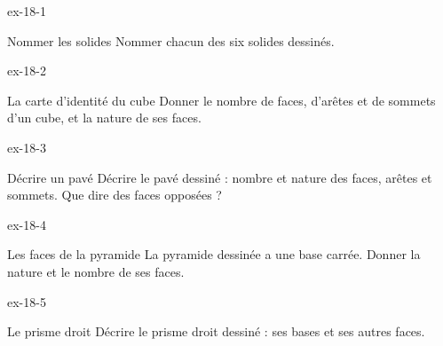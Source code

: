 \clearpage{}
\begin{blocLivre}{ex-18-1}\begin{exercice}[1]{Nommer les solides}
Nommer chacun des six solides dessinés.
\label{fig-ex-18-1}
\end{exercice}\end{blocLivre}
\begin{blocLivre}{ex-18-2}\begin{exercice}[1]{La carte d’identité du cube}
Donner le nombre de faces, d’arêtes et de sommets d’un cube, et la nature de ses faces.
\label{fig-ex-18-2}
\end{exercice}\end{blocLivre}
\begin{blocLivre}{ex-18-3}\begin{exercice}[1]{Décrire un pavé}
Décrire le pavé dessiné : nombre et nature des faces, arêtes et sommets. Que dire des faces opposées ?
\label{fig-ex-18-3}
\end{exercice}\end{blocLivre}
\begin{blocLivre}{ex-18-4}\begin{exercice}[1]{Les faces de la pyramide}
La pyramide dessinée a une base carrée. Donner la nature et le nombre de ses faces.
\label{fig-ex-18-4}
\end{exercice}\end{blocLivre}
\begin{blocLivre}{ex-18-5}\begin{exercice}[1]{Le prisme droit}
Décrire le prisme droit dessiné : ses bases et ses autres faces.
\label{fig-ex-18-5}
\end{exercice}\end{blocLivre}


